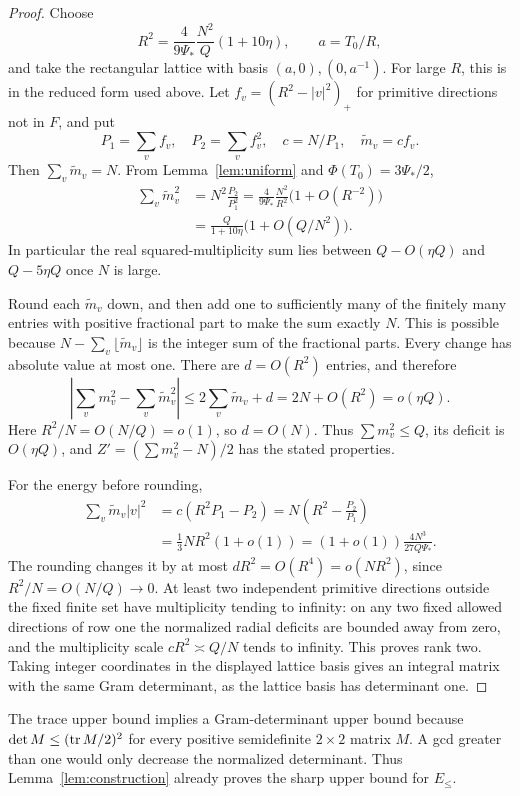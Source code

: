 \documentclass[11pt]{article}
\theoremstyle{remark}\newtheorem{remark}[theorem]{Remark}
\begin{document}
\begin{proof}
Choose
\[
 R^2=\frac4{9\Psi_*}\frac{N^2}{Q}(1+10\eta),\qquad a=T_0/R,
\]
and take the rectangular lattice with basis $(a,0),(0,a^{-1})$. For large $R$, this is in the reduced form used above. Let $f_v=(R^2-|v|^2)_+$ for primitive directions not in $F$, and put
\[
 P_1=\sum_v f_v,\quad P_2=\sum_v f_v^2,\quad
 c=N/P_1,\quad \widetilde m_v=c f_v.
\]
Then $\sum_v\widetilde m_v=N$. From Lemma~\ref{lem:uniform} and $\Phi(T_0)=3\Psi_*/2$,
\begin{align*}
 \sum_v\widetilde m_v^2
 &=N^2\frac{P_2}{P_1^2}
 =\frac4{9\Psi_*}\frac{N^2}{R^2}\bigl(1+O(R^{-2})\bigr)\\
 &=\frac{Q}{1+10\eta}\bigl(1+O(Q/N^2)\bigr).
\end{align*}
In particular the real squared-multiplicity sum lies between $Q-O(\eta Q)$ and $Q-5\eta Q$ once $N$ is large.

Round each $\widetilde m_v$ down, and then add one to sufficiently many of the finitely many entries with positive fractional part to make the sum exactly $N$. This is possible because $N-\sum_v\lfloor\widetilde m_v\rfloor$ is the integer sum of the fractional parts. Every change has absolute value at most one. There are $d=O(R^2)$ entries, and therefore
\[
 \left|\sum_v m_v^2-\sum_v\widetilde m_v^2\right|
 \le2\sum_v\widetilde m_v+d=2N+O(R^2)=o(\eta Q).
\]
Here $R^2/N=O(N/Q)=o(1)$, so $d=O(N)$. Thus $\sum m_v^2\le Q$, its deficit is $O(\eta Q)$, and $Z'=(\sum m_v^2-N)/2$ has the stated properties.

For the energy before rounding,
\begin{align*}
 \sum_v\widetilde m_v|v|^2
 &=c(R^2P_1-P_2)
 =N\left(R^2-\frac{P_2}{P_1}\right)\\
 &=\frac13NR^2(1+o(1))
 =(1+o(1))\frac{4N^3}{27Q\Psi_*}.
\end{align*}
The rounding changes it by at most $dR^2=O(R^4)=o(NR^2)$, since $R^2/N=O(N/Q)\to0$. At least two independent primitive directions outside the fixed finite set have multiplicity tending to infinity: on any two fixed allowed directions of row one the normalized radial deficits are bounded away from zero, and the multiplicity scale $cR^2\asymp Q/N$ tends to infinity. This proves rank two. Taking integer coordinates in the displayed lattice basis gives an integral matrix with the same Gram determinant, as the lattice basis has determinant one.
\end{proof}

The trace upper bound implies a Gram-determinant upper bound because $\det M\le(\operatorname{tr} M/2)^2$ for every positive semidefinite $2\times2$ matrix $M$. A gcd greater than one would only decrease the normalized determinant. Thus Lemma~\ref{lem:construction} already proves the sharp upper bound for $E_{\le}$.
\end{document}
